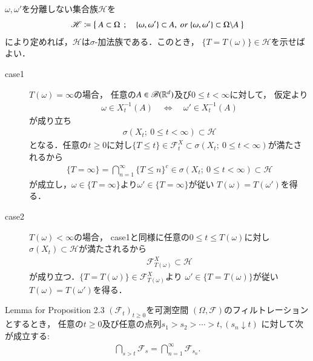 	\begin{prf}
		$\omega,\omega'$を分離しない集合族$\mathscr{H}$を
		\begin{align}
			\mathscr{H} \coloneqq \left\{\ A \subset \Omega\ \, ; \quad \{\omega,\omega'\} \subset A,\ or\ \{\omega,\omega'\} \subset \Omega \backslash A\ \right\}
		\end{align}
		により定めれば，$\mathscr{H}$は$\sigma$-加法族である．このとき，
		$\{T = T(\omega)\} \in \mathscr{H}$を示せばよい．
		\begin{description}
			\item[case1]
				$T(\omega) = \infty$の場合，
				任意の$A \in \mathscr{B}(\mathbb{R}^d)$及び$0 \leq t < \infty$に対して，
				仮定より
				\begin{align}
					\omega \in X_t^{-1}(A) \quad \Leftrightarrow \quad
					\omega' \in X_t^{-1}(A)
				\end{align}
				が成り立ち
				\begin{align}
					\sigma(X_t;\ 0 \leq t < \infty) \subset \mathscr{H}
				\end{align}
				となる．任意の$t \geq 0$に対し$\{T \leq t\} \in \mathscr{F}^X_t \subset 
				\sigma(X_t;\ 0 \leq t < \infty)$が満たされるから
				\begin{align}
					\{T = \infty\} = \bigcap_{n=1}^\infty \{T \leq n\}^c
					\in \sigma(X_t;\ 0 \leq t < \infty) \subset \mathscr{H}
				\end{align}
				が成立し，$\omega \in \{T = \infty\}$より$\omega' \in \{T = \infty\}$が従い
				$T(\omega) = T(\omega')$を得る．
				
			\item[case2]
				$T(\omega) < \infty$の場合，
				case1と同様に任意の$0 \leq t \leq T(\omega)$に対し
				$\sigma(X_t) \subset \mathscr{H}$が満たされるから
				\begin{align}
					\mathscr{F}^X_{T(\omega)} \subset \mathscr{H}
				\end{align}
				が成り立つ．$\{T = T(\omega)\} \in \mathscr{F}^X_{T(\omega)}$より
				$\omega' \in \{T = T(\omega)\}$が従い$T(\omega) = T(\omega')$を得る．
				\QED
		\end{description}
	\end{prf}
	
	\begin{itembox}[l]{Lemma for Proposition 2.3}
		$(\mathscr{F}_t)_{t \geq 0}$を可測空間
		$(\Omega,\mathscr{F})$のフィルトレーションとするとき，
		任意の$t \geq 0$及び任意の点列$s_1  > s_2 > \cdots > t, (s_n \downarrow t)$
		に対して次が成立する:
		\begin{align}
			\bigcap_{s>t} \mathscr{F}_s = \bigcap_{n=1}^\infty \mathscr{F}_{s_n}.
		\end{align}
	\end{itembox}
	
